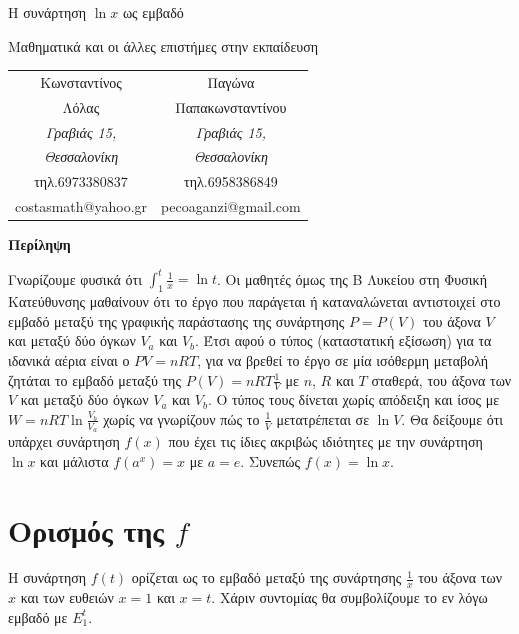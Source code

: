 \documentclass[12pt,titlepage]{article}
\begin{document}
\begin{titlepage}
 \begin{center}
  \Huge {Η συνάρτηση $\ln x$ ως εμβαδό}

  \vspace{1.5cm}
  \Large {Μαθηματικά και οι άλλες επιστήμες στην εκπαίδευση}
 \end{center}

 \vspace{2cm}
 \begin{center}

  \begin{tabular}{ c c }
   \Large{Κωνσταντίνος} & \Large{Παγώνα}\\
   \Large{Λόλας} & \Large{Παπακωνσταντίνου} \\
   \textit{Γραβιάς 15,} & \textit{Γραβιάς 15,} \\
   \textit{Θεσσαλονίκη} & \textit{Θεσσαλονίκη} \\
   τηλ.6973380837 & τηλ.6958386849\\
   costasmath@yahoo.gr & pecoaganzi@gmail.com \\
  \end{tabular}

  \vspace{2cm}
  \textbf{Περίληψη}

  Γνωρίζουμε φυσικά ότι $\int_1^t \frac{1}{x}=\ln t$. Οι μαθητές όμως της Β Λυκείου στη Φυσική Κατεύθυνσης μαθαίνουν ότι το έργο που παράγεται ή καταναλώνεται αντιστοιχεί στο εμβαδό μεταξύ της γραφικής παράστασης της συνάρτησης $P=P(V)$ του άξονα $V$ και μεταξύ δύο όγκων $V_a$ και $V_b$. Έτσι αφού ο τύπος (καταστατική εξίσωση) για τα ιδανικά αέρια είναι ο $PV=nRT$, για να βρεθεί το έργο σε μία ισόθερμη μεταβολή ζητάται το εμβαδό μεταξύ της $P(V) = nRT\frac{1}{V}$ με $n$, $R$ και $T$ σταθερά, του άξονα των $V$ και μεταξύ δύο όγκων $V_a$ και $V_b$. Ο τύπος τους δίνεται χωρίς απόδειξη και ίσος με $W=nRT \ln \frac{V_b}{V_a}$ χωρίς να γνωρίζουν πώς το $\frac{1}{V}$ μετατρέπεται σε $\ln V$. Θα δείξουμε ότι υπάρχει συνάρτηση $f(x)$ που έχει τις ίδιες ακριβώς ιδιότητες με την συνάρτηση $\ln x$ και μάλιστα $f(a^x)=x$ με $a=e$. Συνεπώς $f(x)=\ln x$.

 \end{center}

\end{titlepage}

\section{Ορισμός της $f$}
Η συνάρτηση $f(t)$ ορίζεται ως το εμβαδό μεταξύ της συνάρτησης $\frac{1}{x}$ του άξονα των $x$ και των ευθειών $x=1$ και $x=t$. Χάριν συντομίας θα συμβολίζουμε το εν λόγω εμβαδό με $E_1^t$.
\end{document}
